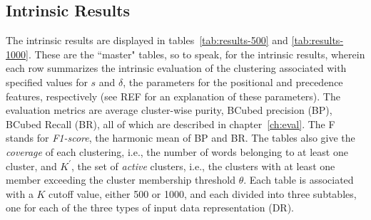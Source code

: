 \subsection{Intrinsic Results}
	The intrinsic results are displayed in tables~\ref{tab:results-500} and \ref{tab:results-1000}. These are the ``master" tables, so to speak, for the intrinsic results, wherein each row %
	summarizes the intrinsic evaluation of the clustering associated with specified values for $s$ and $\delta$, the parameters for the positional and precedence features, respectively (see REF for an explanation of these parameters). The evaluation metrics are average cluster-wise purity, BCubed precision (BP), BCubed Recall (BR), all of which are described in chapter~\ref{ch:eval}. The F stands for \emph{F1-score}, the harmonic mean of BP and BR.  The tables also give the \emph{coverage} of each clustering, i.e., the number of words belonging to at least one cluster, and $K^{\prime}$, the set of \emph{active} clusters, i.e., the clusters with at least one member exceeding the cluster membership threshold $\theta$. Each table is associated with a $K$ cutoff value, either 500 or 1000, and each divided into three subtables, one for each of the three types of input data representation (DR).
	

